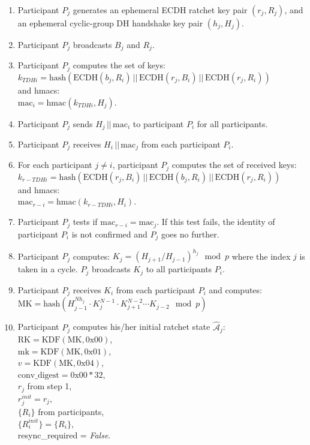 \documentclass[%
preprint,
amsmath,amssymb,
aps,
prb,
floatfix,
]{revtex4-1}
\begin{document}
\begin{enumerate}
\item Participant $P_j$ generates an ephemeral ECDH ratchet key pair $(r_j,
R_j)$, and an ephemeral cyclic-group DH handshake key pair $(h_j, H_j)$.
\item Participant $P_j$ broadcasts $B_j$ and $R_j$.
\item Participant $P_j$ computes the set of keys: \\ $k_{TDHi} =
\mathrm{hash}(\mathrm{ECDH}(b_j, R_i) \, ||
\, \mathrm{ECDH}(r_j, B_i) \, || \, \mathrm{ECDH}(r_j, R_i))$ \\ and hmacs: \\
$\mathrm{mac}_i = \mathrm{hmac}(k_{TDHi}, H_j)$.
\item Participant $P_j$ sends $H_j \, || \, \mathrm{mac}_i$ to participant $P_i$ for all
participants.
\item Participant $P_j$ receives $H_i \, || \, \mathrm{mac}_j$ from each
participant $P_i$.
\item For each participant $j \ne i$, participant $P_j$ computes the set of received keys:\\ $k_{r-TDHi} =
\mathrm{hash}(\mathrm{ECDH}(r_j, B_i) \, ||
\, \mathrm{ECDH}(b_j, R_i) \, || \, \mathrm{ECDH}(r_j, R_i))$ \\ and hmacs: \\
$\mathrm{mac}_{r-i} = \mathrm{hmac}(k_{r-TDHi}, H_i)$.
\item Participant $P_j$ tests if $\mathrm{mac}_{r-i} = \mathrm{mac}_j$. If this
test fails, the identity of participant $P_i$ is not confirmed and $P_j$ goes no
further.
\item Participant $P_j$ computes: $K_j = (H_{j+1}/H_{j-1})^{h_j} \mod p$ where the
index $j$ is taken in a cycle. $P_j$ broadcasts $K_j$ to all participants $P_i$.
\item Participant $P_j$ receives $K_i$ from each participant $P_i$ and
computes:\\ $\mathrm{MK} = \mathrm{hash}(H_{j-1}^{ N h_j} \cdot K_j^{N-1} \cdot
K_{j+1}^{N-2} \cdots K_{j-2} \mod p )$
\item Participant $P_j$ computes his/her initial ratchet state
$\mathcal{\hat{A}}_j$:\\
$\mathrm{RK} = \mathrm{KDF}(\mathrm{MK}, 0\mathrm{x}00)$, \\
$\mathrm{mk} = \mathrm{KDF}(\mathrm{MK}, 0\mathrm{x}01)$, \\
$v = \mathrm{KDF}(\mathrm{MK}, 0\mathrm{x}04)$, \\
$\mathrm{conv\_digest} = 0\mathrm{x}00 * 32$, \\
$r_j$ from step 1, \\
$r_j^{init} = r_j$, \\
$\{R_i\}$ from participants, \\
$\{R_i^{init}\} = \{R_i\}$, \\
resync\_required = \textit{False}.
\end{enumerate}
\end{document}
